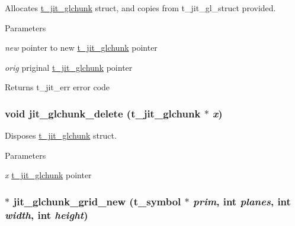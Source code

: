 Allocates \hyperlink{structt__jit__glchunk}{t\_\-jit\_\-glchunk} struct, and copies from t\_\-jit\_\-gl\_\-struct provided. 
\begin{DoxyParams}{Parameters}
\item[{\em new}]pointer to new \hyperlink{structt__jit__glchunk}{t\_\-jit\_\-glchunk} pointer \item[{\em orig}]priginal \hyperlink{structt__jit__glchunk}{t\_\-jit\_\-glchunk} pointer\end{DoxyParams}
\begin{DoxyReturn}{Returns}
t\_\-jit\_\-err error code 
\end{DoxyReturn}
\hypertarget{group__ob3dmod_gae4fabfa866a64f68987de90e065e604e}{
\subsubsection[{jit\_\-glchunk\_\-delete}]{\setlength{\rightskip}{0pt plus 5cm}void jit\_\-glchunk\_\-delete ({\bf t\_\-jit\_\-glchunk} $\ast$ {\em x})}}
\label{group__ob3dmod_gae4fabfa866a64f68987de90e065e604e}


Disposes \hyperlink{structt__jit__glchunk}{t\_\-jit\_\-glchunk} struct. 
\begin{DoxyParams}{Parameters}
\item[{\em x}]\hyperlink{structt__jit__glchunk}{t\_\-jit\_\-glchunk} pointer \end{DoxyParams}
\hypertarget{group__ob3dmod_ga5c8a73551161b7ba602c0bea2ea9e479}{
\subsubsection[{jit\_\-glchunk\_\-grid\_\-new}]{$\ast$ jit\_\-glchunk\_\-grid\_\-new ({\bf t\_\-symbol} $\ast$ {\em prim}, \/  int {\em planes}, \/  int {\em width}, \/  int {\em height})}}
\label{group__ob3dmod_ga5c8a73551161b7ba602c0bea2ea9e479}


